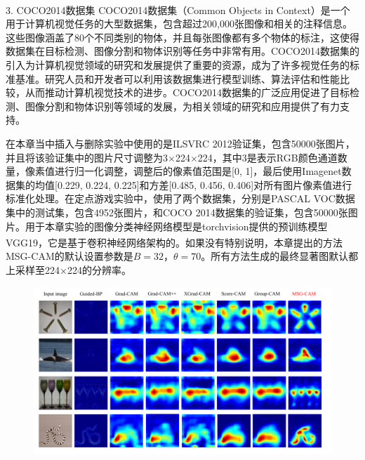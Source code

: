 3. COCO2014数据集
COCO2014数据集（Common Objects in Context）\textsuperscript{\cite{coco}}是一个用于计算机视觉任务的大型数据集，包含超过200,000张图像和相关的注释信息。这些图像涵盖了80个不同类别的物体，并且每张图像都有多个物体的标注，这使得数据集在目标检测、图像分割和物体识别等任务中非常有用。COCO2014数据集的引入为计算机视觉领域的研究和发展提供了重要的资源，成为了许多视觉任务的标准基准。研究人员和开发者可以利用该数据集进行模型训练、算法评估和性能比较，从而推动计算机视觉技术的进步。COCO2014数据集的广泛应用促进了目标检测、图像分割和物体识别等领域的发展，为相关领域的研究和应用提供了有力支持。

在本章当中插入与删除实验中使用的是ILSVRC 2012验证集，包含50000张图片，并且将该验证集中的图片尺寸调整为3$\times$224$\times$224，其中$3$是表示RGB颜色通道数量，像素值进行归一化调整，调整后的像素值范围是[0, 1]，最后使用Imagenet数据集的均值[0.229, 0.224, 0.225]和方差[0.485, 0.456, 0.406]对所有图片像素值进行标准化处理。在定点游戏实验中，使用了两个数据集，分别是PASCAL VOC数据集中的测试集，包含4952张图片，和COCO 2014数据集的验证集，包含50000张图片。用于本章实验的图像分类神经网络模型是torchvision提供的预训练模型VGG19\textsuperscript{\cite{simonyan2014very}}，它是基于卷积神经网络架构的。如果没有特别说明，本章提出的方法MSG-CAM的默认设置参数是$B=32$，$\theta=70$。所有方法生成的最终显著图默认都上采样至224$\times$224的分辨率。

\begin{figure}[h]
	\centering 
	\includegraphics[width=15cm]{fig/ch3/msgContrast.pdf}
	\label{fig:msgContrast}
\end{figure}

